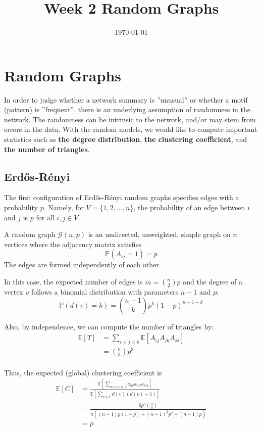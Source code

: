 \documentclass{article}
\title{Week 2 Random Graphs}
\date{\today}
\begin{document}
\maketitle

\section{Random Graphs}
In order to judge whether a network summary is ”unusual” or whether a motif (pattern) is ”frequent”, there is an underlying assumption of randomness in the network. The randomness can be intrinsic to the network, and/or may stem from errors in the data. With the random models, we would like to compute important statistics such as \textbf{the degree distribution}, \textbf{the clustering coefficient}, and \textbf{the number of triangles}.

\subsection{Erd\H{o}s-R\'{e}nyi}
The first configuration of Erd\H{o}s-R\'{e}nyi random graphs specifies edges with a probability $p$. Namely, for $V=\{1,2,\ldots,n\}$, the probability of an edge between $i$ and $j$ is $p$ for all $i,j\in V$.
\begin{definition}
    A random graph $\mathcal{G}(n,p)$ is an undirected, unweighted, simple graph on $n$ vertices where the adjacency matrix satisfies
    \begin{equation*}
        \mathbb{P}(A_{ij}=1)=p
    \end{equation*}
    The edges are formed independently of each other.
\end{definition}

In this case, the expected number of edges is $m=\binom{n}{2}p$ and the degree of a vertex $v$ follows a binomial distribution with parameters $n-1$ and $p$:
$$
\mathbb{P}(d(v)=k)=\binom{n-1}{k}p^k(1-p)^{n-1-k}
$$

Also, by independence, we can compute the number of triangles by:
\begin{align*}
    \mathbb{E}[T]&=\sum_{i<j<k} \mathbb{E}[A_{ij}A_{jk}A_{ki}]\\
    &=\binom{n}{3}p^3\\
\end{align*}

Thus, the expected (global) clustering coefficient is
\begin{align*}
    \mathbb{E}[C]&=\frac{\mathbb{E}[\sum_{u,v,w \in V} a_{uv}a_{vw}a_{wu}]}{\mathbb{E}[\sum_{v\in V} d(v)(d(v)-1)]} \\
    &= \frac{6p^3 \binom{n}{3}}{n ((n-1)p(1-p) + (n-1)^2p^2 -(n-1)p)}\\
    &=p
\end{align*}
\end{document}
